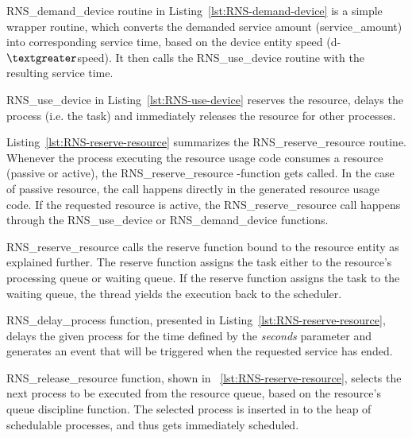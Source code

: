 

RNS\_demand\_device routine in Listing~\ref{lst:RNS-demand-device} is a simple wrapper routine, which converts the demanded service amount (service\_amount) into corresponding service time, based on the device entity speed (d-$\textgreater$speed). It then calls the RNS\_use\_device routine with the resulting service time.



RNS\_use\_device in Listing~\ref{lst:RNS-use-device} reserves the resource, delays the process (i.e. the task) and immediately releases the resource for other processes.



Listing~\ref{lst:RNS-reserve-resource} summarizes the RNS\_reserve\_resource routine. Whenever the process executing the resource usage code consumes a resource (passive or active), the RNS\_reserve\_resource -function gets called. In the case of passive resource, the call happens directly in the generated resource usage code. If the requested resource is active, the RNS\_reserve\_resource call happens through the RNS\_use\_device or RNS\_demand\_device functions.

RNS\_reserve\_resource calls the reserve function bound to the resource entity as explained further. The reserve function assigns the task either to the resource's processing queue or waiting queue. If the reserve function assigns the task to the waiting queue, the thread yields the execution back to the scheduler.



RNS\_delay\_process function, presented in Listing~\ref{lst:RNS-reserve-resource}, delays the given process for the time defined by the \emph{seconds} parameter and generates an event that will be triggered when the requested service has ended.



RNS\_release\_resource function, shown in ~\ref{lst:RNS-reserve-resource}, selects the next process to be executed from the resource queue, based on the resource's queue discipline function. The selected process is inserted in to the heap of schedulable processes, and thus gets immediately scheduled.

